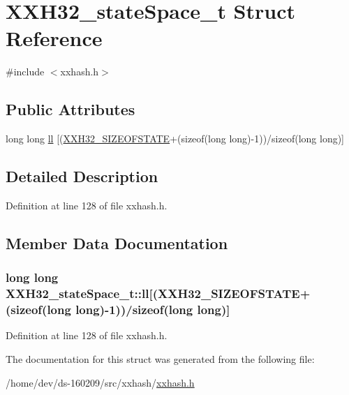 \hypertarget{struct_x_x_h32__state_space__t}{}\section{X\+X\+H32\+\_\+state\+Space\+\_\+t Struct Reference}
\label{struct_x_x_h32__state_space__t}


{\ttfamily \#include $<$xxhash.\+h$>$}

\subsection*{Public Attributes}
\begin{DoxyCompactItemize}
\item 
long long \hyperlink{struct_x_x_h32__state_space__t_a7e66f0e3bbe805d5694f615e6a3fd878}{ll} \mbox{[}(\hyperlink{xxhash_8h_a7193b472201c133d4edb218227b27f2b}{X\+X\+H32\+\_\+\+S\+I\+Z\+E\+O\+F\+S\+T\+A\+T\+E}+(sizeof(long long)-\/1))/sizeof(long long)\mbox{]}
\end{DoxyCompactItemize}


\subsection{Detailed Description}


Definition at line 128 of file xxhash.\+h.



\subsection{Member Data Documentation}
\hypertarget{struct_x_x_h32__state_space__t_a7e66f0e3bbe805d5694f615e6a3fd878}{}
\subsubsection[{ll}]{\setlength{\rightskip}{0pt plus 5cm}long long X\+X\+H32\+\_\+state\+Space\+\_\+t\+::ll\mbox{[}({\bf X\+X\+H32\+\_\+\+S\+I\+Z\+E\+O\+F\+S\+T\+A\+T\+E}+(sizeof(long long)-\/1))/sizeof(long long)\mbox{]}}\label{struct_x_x_h32__state_space__t_a7e66f0e3bbe805d5694f615e6a3fd878}


Definition at line 128 of file xxhash.\+h.



The documentation for this struct was generated from the following file\+:\begin{DoxyCompactItemize}
\item 
/home/dev/ds-\/160209/src/xxhash/\hyperlink{xxhash_8h}{xxhash.\+h}\end{DoxyCompactItemize}
